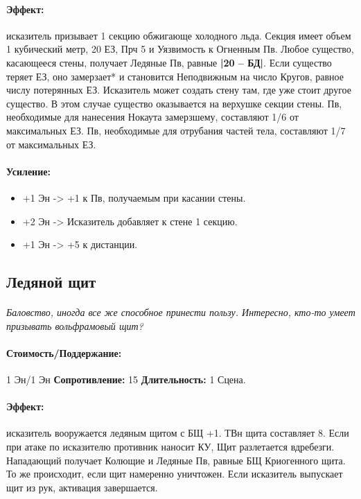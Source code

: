 \begin{itemize}
\begin{itemize}
\paragraph{Эффект: }исказитель призывает 1 секцию обжигающе холодного льда. Секция имеет объем 1 кубический метр, 20 ЕЗ, Прч 5 и Уязвимость к Огненным Пв. Любое существо, касающееся стены, получает Ледяные Пв, равные 
\textbf{|20 – БД|}. Если существо теряет ЕЗ, оно замерзает* и становится Неподвижным на число Кругов, равное числу потерянных ЕЗ. Исказитель может создать стену там, где уже стоит другое существо. В этом случае существо оказывается на верхушке секции стены. 
\newline *Пв, необходимые для нанесения Нокаута замерзшему, составляют 1/6 от максимальных ЕЗ. Пв, необходимые для отрубания частей тела, составляют 1/7 от максимальных ЕЗ.
\paragraph{Усиление:}
\begin{itemize}
\item+1 Эн -> +1 к Пв, получаемым при касании стены.
\item+2 Эн -> Исказитель добавляет к стене 1 секцию.
\item+1 Эн -> +5 к дистанции.
\end{itemize}
\subsection{Ледяной щит}
\paragraph{} 
\textit{
\tbd Баловство, иногда все же способное принести пользу. Интересно, кто-то умеет призывать вольфрамовый щит?}
\paragraph{Стоимость/Поддержание: }1 Эн/1 Эн
\newline
\textbf{Сопротивление: }15
\newline 
\textbf{Длительность: }1 Сцена.
\paragraph{Эффект: }исказитель вооружается ледяным щитом с БЩ +1. ТВн щита составляет 8. Если при атаке по исказителю противник наносит КУ, Щит разлетается вдребезги. Нападающий получает Колющие и Ледяные Пв, равные БЩ Криогенного щита. То же происходит, если щит намеренно уничтожен. 
\newline Если исказитель выпускает щит из рук, активация завершается.

\end{itemize}
\end{itemize}
